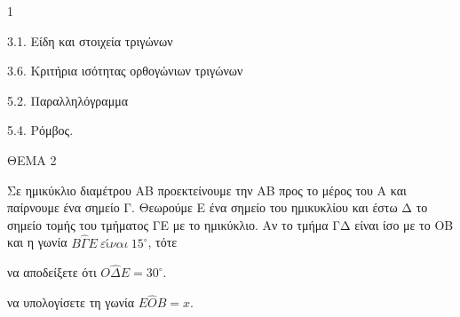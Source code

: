 \begin{ylh}{1}
    \item 3.1. Είδη και στοιχεία τριγώνων
    \item 3.6. Κριτήρια ισότητας ορθογώνιων τριγώνων
    \item 5.2. Παραλληλόγραμμα
    \item 5.4. Ρόμβος.
\end{ylh}

ΘΕΜΑ 2

Σε ημικύκλιο διαμέτρου ΑΒ προεκτείνουμε την ΑΒ προς το μέρος του Α και παίρνουμε ένα σημείο Γ. Θεωρούμε Ε ένα σημείο του ημικυκλίου και έστω Δ το σημείο τομής του τμήματος ΓΕ με το ημικύκλιο. Αν το τμήμα ΓΔ είναι ίσο με το ΟΒ και η γωνία $Β\widehat{\Gamma}Ε\ \varepsilon ί\nu\alpha\iota\ 15{^\circ}$, τότε

\begin{alist}
\item να αποδείξετε ότι $O\widehat{\Delta}E = 30^{\circ}$. 
\item να υπολογίσετε τη γωνία $E\widehat{O}B = x$. 

\begin{center}
\end{center}
\end{alist}

